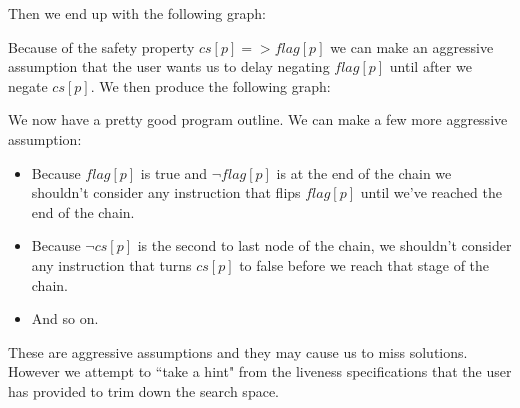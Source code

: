 \documentclass[12pt]{article}
\begin{document}
Then we end up with the following graph:
\begin{center}
\end{center}

Because of the safety property $cs[p] => flag[p]$ we can make an aggressive assumption that the user wants us to delay negating $flag[p]$ until after we negate $cs[p]$.  We then produce the following graph:
\begin{center}
\end{center}

We now have a pretty good program outline.  We can make a few more aggressive assumption:
\begin{itemize}
	\item Because $flag[p]$ is true and $\lnot flag[p]$ is at the end of the chain we shouldn't consider any instruction that flips $flag[p]$ until we've reached the end of the chain.  
	\item Because $\lnot cs[p]$ is the second to last node of the chain, we shouldn't consider any instruction that turns $cs[p]$ to false before we reach that stage of the chain.  
	\item And so on.  
\end{itemize}

These are aggressive assumptions and they may cause us to miss solutions.  However we attempt to ``take a hint" from the liveness specifications that the user has provided to trim down the search space.  
\end{document}
